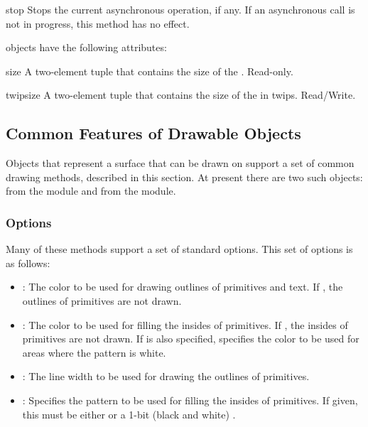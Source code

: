 \begin{methoddesc}[Image]{stop}{}
Stops the current asynchronous operation, if any. If an asynchronous call is 
not in progress, this method has no effect.
\end{methoddesc}

 objects have the following attributes:

\begin{memberdesc}[Image]{size}
A two-element tuple that contains the size of the . Read-only.
\end{memberdesc}

\begin{memberdesc}[Image]{twipsize}
A two-element tuple that contains the size of the  in twips. Read/Write.
\end{memberdesc}

\subsection{Common Features of Drawable Objects}
\label{subsec:common}
Objects that represent a surface that can be drawn on support a set of 
common drawing methods, described in this section. At present there are two 
such objects:  from the  module and 
 from the  module. 

\subsubsection{Options}
\label{subsubsec:options}
Many of these methods support a set of standard options. This set of options 
is as follows:

\begin{itemize}
\item {}: The color to be used for drawing outlines of primitives and text. If , the outlines of primitives are not drawn.
\item {}: The color to be used for filling the insides of primitives. If , the insides of primitives are not drawn. If  is also specified,  specifies the color to be used for areas where the pattern is white.
\item {}: The line width to be used for drawing the outlines of primitives.
\item {}: Specifies the pattern to be used for filling the insides of primitives. If given, this must be either  or a 1-bit (black and white) .
\end{itemize}

